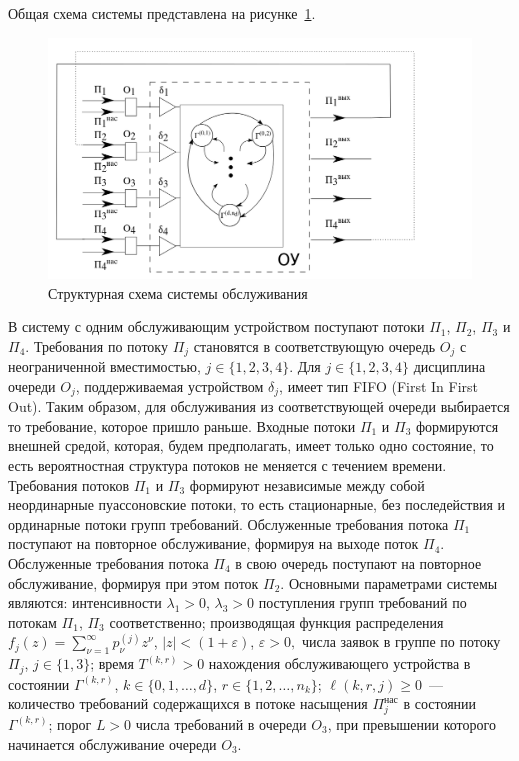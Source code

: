 \documentclass[14pt]{extarticle}
\theoremstyle{theorem}
\theoremstyle{remark}
\begin{document}
Общая схема системы представлена на рисунке~\ref{SystemScheme}.
\begin{figure}[h]
\includegraphics[scale=0.45]{SystemScheme.png} 
\caption{Структурная схема системы обслуживания}
\label{SystemScheme}
\end{figure}
В систему с одним обслуживающим устройством поступают потоки $\Pi_1$, $\Pi_2$, $\Pi_3$  и $\Pi_4$. Требования по потоку $\Pi_j$ становятся в соответствующую очередь $O_j$ с неограниченной вместимостью, $j\in \{1, 2, 3, 4\}$. Для $j \in \{1, 2, 3, 4\}$ дисциплина очереди $O_j$, поддерживаемая устройством $\delta_j$, имеет тип FIFO (First In First Out). Таким образом, для обслуживания из соответствующей очереди выбирается то требование, которое пришло раньше. Входные потоки $\Pi_1$ и $\Pi_3$ формируются внешней средой, которая, будем предполагать, имеет только одно состояние, то есть вероятностная структура потоков не меняется с течением времени. Требования потоков $\Pi_1$ и $\Pi_3$ формируют независимые между собой неординарные пуассоновские потоки, то есть  стационарные, без последействия и ординарные потоки групп требований. Обслуженные требования потока $\Pi_1$ поступают на повторное обслуживание, формируя на выходе поток $\Pi_4$. Обслуженные требования потока $\Pi_4$ в свою очередь поступают на повторное обслуживание, формируя при этом поток $\Pi_2$.  Основными параметрами системы являются: интенсивности $\lambda_1>0$, $\lambda_3>0$ поступления групп требований по потокам  $\Pi_1$, $\Pi_3$ соответственно; производящая функция распределения $f_j(z) = \sum_{\nu=1}^{\infty} p_{\nu}^{(j)} z ^{\nu}$, $|z|<(1+\varepsilon)$, $\varepsilon>0,$ числа заявок в группе по потоку $\Pi_j$, $j \in \{1,3\}$; время $T^{(k,r)}>0$  нахождения обслуживающего устройства в состоянии $\Gamma^{(k,r)}$, $k\in \{0, 1, \ldots, d\}$, $r \in \{1, 2, \ldots, n_k\}$; $\ell(k,r,j)\geqslant 0$~--- количество требований содержащихся в потоке насыщения $\Pi^{\text{нас}}_j$ в состоянии  $\Gamma^{(k,r)}$; 
 порог $L > 0$ числа требований в очереди $O_3$, при превышении которого начинается обслуживание очереди $O_3$.
 
\end{document}
